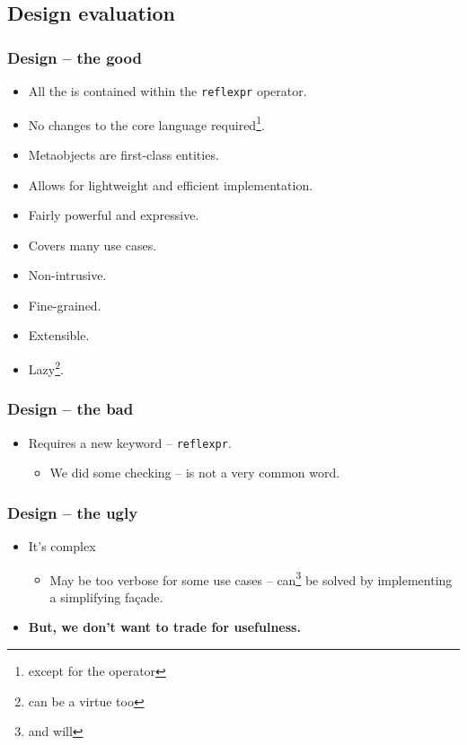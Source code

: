\documentclass[compress,table,xcolor=table]{beamer}
\begin{document}
\subsection{Design evaluation}
\begin{frame}
\frametitle{Design -- the good}
  \large
  \begin{itemize}
    \item All the  is contained within the \texttt{reflexpr} operator.
    \item No changes to the core language required\footnote{except for the operator}.
    \item Metaobjects are first-class entities.
    \item Allows for lightweight and efficient implementation.
    \item Fairly powerful and expressive.
    \item Covers many use cases.
    \item Non-intrusive.
    \item Fine-grained.
    \item Extensible.
    \item Lazy\footnote{can be a virtue too}.
  \end{itemize}
\end{frame}

\begin{frame}
\frametitle{Design -- the bad}
  \large
  \begin{itemize}
    \item Requires a new keyword -- \texttt{reflexpr}.
    \begin{itemize}
      \item We did some checking --  is not a very common word.
    \end{itemize}
  \end{itemize}
\end{frame}

\begin{frame}
\frametitle{Design -- the ugly}
  \large
  \begin{itemize}
    \item It's complex
    \begin{itemize}
      \item May be too verbose for some use cases -- can\footnote{and will} be
      solved by implementing a simplifying fa\c{c}ade.
    \end{itemize}
    \item \textbf{But, we don't want to trade  for usefulness.}
  \end{itemize}
\end{frame}
\end{document}
